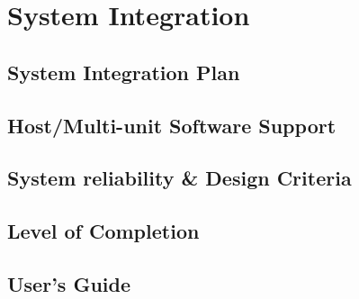\section{System Integration}
\subsection{System Integration Plan}
\subsection{Host/Multi-unit Software Support}
\subsection{System reliability \& Design Criteria}
\subsection{Level of Completion}
\subsection{User’s Guide}

